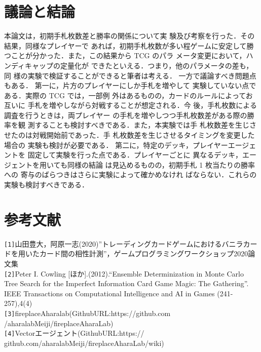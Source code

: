\documentclass[twocolumn]{ltjsarticle}
\begin{document}
\section{議論と結論}
\small{
  本論文は，初期手札枚数差と勝率の関係について実
験及び考察を行った．その結果，同様なプレイヤーで
あれば，初期手札枚数が多い程ゲームに安定して勝
つことが分かった．また，この結果から TCG のパラ
メータ変更において，ハンディキャップの定量化が
できたといえる．つまり，他のパラメータの差も，同
様の実験で検証することができると筆者は考える．
一方で議論すべき問題点もある．
第一に，片方のプレイヤーにしか手札を増やして
実験していない点である．実際の TCG では，一部例
外はあるものの，カードのルールによってお互いに
手札を増やしながら対戦することが想定される．今
後，手札枚数による調査を行うときは，両プレイヤー
の手札を増やしつつ手札枚数差がある際の勝率を観
測することも検討すべきである．また，本実験では手
札枚数差を生じさせたのは対戦開始前であった．手
札枚数差を生じさせるタイミングを変更した場合の
実験も検討が必要である．
第二に，特定のデッキ，プレイヤーエージェントを
固定して実験を行った点である．プレイヤーごとに
異なるデッキ，エージェントを用いても同様の結論
は見込めるものの，初期手札 1 枚当たりの勝率への
寄与のばらつきはさらに実験によって確かめなけれ
ばならない．これらの実験も検討すべきである．
}
\section{
  参考文献
}
\small{
  \verb#[1]#山田豊大，阿原一志(2020)”トレーディングカードゲームにおけるバニラカードを用いたカード間の相性計測”，ゲームプログラミングワークショップ2020論文集
  \\
  \verb#[2]#Peter I. Cowling [ほか].(2012).“Ensemble
  Determinization in Monte Carlo Tree Search for the
  Imperfect Information Card Game Magic: The Gathering”.
  IEEE Transactions on Computational Intelligence and AI
  in Games (241-257),4(4)
  \\
  \verb#[3]#fireplaceAharalab(GithubURL:https://github.com
  /aharalabMeiji/fireplaceAharaLab)
  \\
  \verb#[4]#Vectorエージェント(GithubURL:https://
  github.com/aharalabMeiji/fireplaceAharaLab/wiki)
  

  
}

\end{document}

